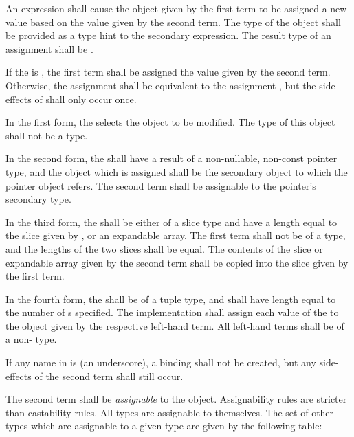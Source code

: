 \specsubsubitem
An  expression shall cause the object given by the
first term to be assigned a new value based on the value given by the second
term. The type of the object shall be provided as a type hint to the secondary
expression. The result type of an assignment shall be .

\specsubsubitem
If the  is \terminal{=}, the first term shall be
assigned the value given by the second term. Otherwise, the assignment
 shall be
equivalent to the assignment
,
but the side-effects of  shall only occur once.

\specsubsubitem
In the first form, the  selects the object to be
modified. The type of this object shall not be a  type.

\specsubsubitem
In the second form, the  shall have a result
of a non-nullable, non-const pointer type, and the object which is assigned
shall be the secondary object to which the pointer object refers. The second
term shall be assignable to the pointer's secondary type.

\specsubsubitem
In the third form, the  shall be either of a slice
type and have a length equal to the slice given by ,
or an expandable array. The first term shall not be of a  type,
and the lengths of the two slices shall be equal. The contents of the slice or
expandable array given by the second term shall be copied into the slice given
by the first term.

\specsubsubitem
In the fourth form, the  shall be of a tuple type, and
shall have length equal to the number of s specified.
The implementation shall assign each value of the 
to the object given by the respective left-hand term. All left-hand terms shall
be of a non- type.

\specsubsubitem
If any name in  is \terminal{\_} (an underscore), a
binding shall not be created, but any side-effects of the second term shall
still occur.

\specsubsubitem
The second term shall be \textit{assignable} to the object. Assignability rules
are stricter than castability rules. All types are assignable to themselves. The
set of other types which are assignable to a given type are given by the
following table:

